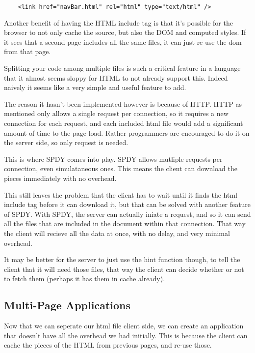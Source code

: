 \documentclass{article}[10pt]
\begin{document}
\begin{verbatim}
	<link href="navBar.html" rel="html" type="text/html" />
\end{verbatim}

Another benefit of having the HTML include tag is that it's possible for the browser to not only cache the source, but also the DOM and computed styles. If it sees that a second page includes all the same files, it can just re-use the dom from that page.

Splitting your code among multiple files is such a critical feature in a language that it almost seems sloppy for HTML to not already support this. Indeed naively it seems like a very simple and useful feature to add.

The reason it hasn't been implemented however is because of HTTP. HTTP as mentioned only allows a single request per connection, so it requires a new connection for each request, and each included html file would add a significant amount of time to the page load. Rather programmers are encouraged to do it on the server side, so only request is needed.

This is where SPDY comes into play. SPDY allows mutliple requests per connection, even simulataneous ones. This means the client can download the pieces immediately with no overhead.

This still leaves the problem that the client has to wait until it finds the html include tag before it can download it, but that can be solved with another feature of SPDY. With SPDY, the server can actually iniate a request, and so it can send all the files that are included in the document within that connection. That way the client will recieve all the data at once, with no delay, and very minimal overhead.

It may be better for the server to just use the hint function though, to tell the client that it will need those files, that way the client can decide whether or not to fetch them (perhaps it has them in cache already).

\subsection{Multi-Page Applications}

Now that we can seperate our html file client side, we can create an application that doesn't have all the overhead we had initially. This is because the client can cache the pieces of the HTML from previous pages, and re-use those.
\end{document}
